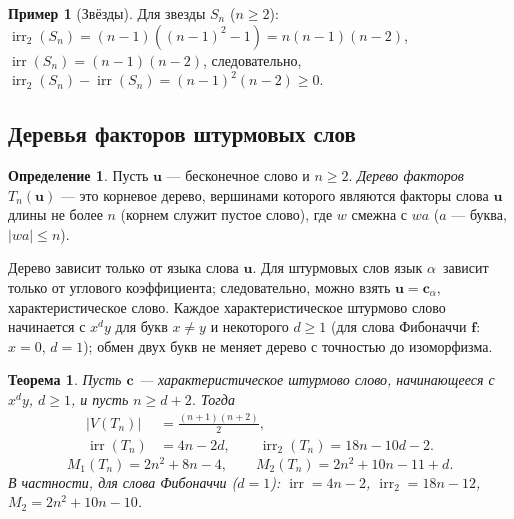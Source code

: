 \documentclass[a4paper,14pt]{extreport}
\theoremstyle{plain}
\newtheorem{theorem}{Теорема}[section]
\theoremstyle{definition}
\newtheorem{definition}{Определение}[section]
\newtheorem{example}{Пример}
\theoremstyle{remark}
\begin{document}
\begin{example}[Звёзды]
	Для звезды $S_n$ ($n\ge2$): $\operatorname{irr}_2(S_n)=(n-1)((n-1)^2-1)=n(n-1)(n-2)$, $\operatorname{irr}(S_n)=(n-1)(n-2)$, следовательно, $\operatorname{irr}_2(S_n)-\operatorname{irr}(S_n)=(n-1)^2(n-2)\ge0$.
\end{example}
\subsection{Деревья факторов штурмовых слов}

\begin{definition}
	Пусть $\mathbf u$ --- бесконечное слово и $n\ge2$. \emph{Дерево факторов} $T_n(\mathbf u)$ --- это корневое дерево, вершинами которого являются факторы слова $\mathbf u$ длины не более $n$
	(корнем служит пустое слово), где $w$ смежна с $wa$ ($a$ --- буква, $|wa|\le n$).
\end{definition}

Дерево зависит только от языка слова $\mathbf u$. Для штурмовых слов язык $\alpha$~зависит только от углового коэффициента; следовательно, можно взять $\mathbf u=\mathbf c_\alpha$, характеристическое слово.
Каждое характеристическое штурмово слово начинается с $x^dy$ для букв $x\ne y$ и некоторого $d\ge1$ (для слова Фибоначчи $\mathbf f$: $x=0$, $d=1$);
обмен двух букв не меняет дерево с точностью до изоморфизма.

\begin{theorem}\label{thm:factortree}
	Пусть $\mathbf c$ --- характеристическое штурмово слово, начинающееся с $x^dy$, $d\ge1$, и пусть $n\ge d+2$. Тогда
	\begin{equation}
		\begin{aligned}
 |V(T_n)|&=\frac{(n+1)(n+2)}2,\\
 \operatorname{irr}(T_n)&=4n-2d,\qquad
 \operatorname{irr}_2(T_n)=18n-10d-2.
\end{aligned}
	\end{equation}
	\begin{equation}
		M_1(T_n)=2n^2+8n-4,\qquad M_2(T_n)=2n^2+10n-11+d .
	\end{equation}
	В частности, для слова Фибоначчи ($d=1$): $\operatorname{irr}=4n-2$, $\operatorname{irr}_2=18n-12$, $M_2=2n^2+10n-10$.
\end{theorem}
\end{document}
